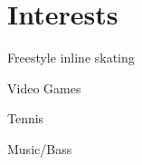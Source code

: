 \documentclass[10pt]{article} %
\begin{document}

\section{Interests}

\begin{itemize}[leftmargin=10mm]
\begin{minipage}{0.5\linewidth}
    \item Freestyle inline skating
    \item Video Games
\end{minipage}
\begin{minipage}{0.5\linewidth}
    \item Tennis
    \item Music/Bass
\end{minipage}
\end{itemize}
\end{document}

